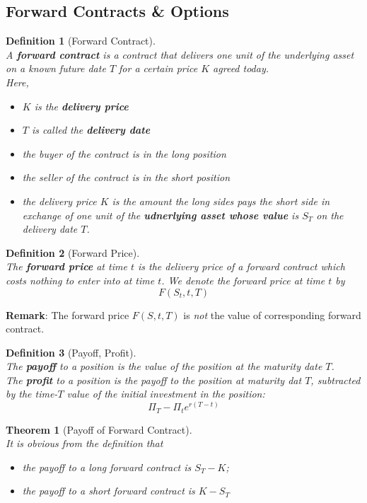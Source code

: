 \documentclass[12pt]{article}
\newtheorem{definition}{Definition}[section]
\newtheorem{theorem}{Theorem}[section]
\theoremstyle{definition}
\begin{document}
\subsection{Forward Contracts \& Options}
\begin{definition}[Forward Contract]
\hfill\\\normalfont A \textbf{forward contract} is a contract that delivers one unit of the underlying asset on a known future date $T$ for a certain price $K$ agreed today.\\
Here,
\begin{itemize}
  \item $K$ is the \textbf{delivery price}
  \item $T$ is called the \textbf{delivery date}
  \item the buyer of the contract is in the long position
  \item the seller of the contract is in the short position
  \item the delivery price $K$ is the amount the long sides pays the short side in exchange of one unit of the \textbf{udnerlying asset whose value} is $S_T$ on the delivery date $T$.
\end{itemize}
\end{definition}
\begin{definition}[Forward Price]
\hfill\\\normalfont The \textbf{forward price} at time $t$ is the delivery price of a forward contract which costs nothing to enter into at time $t$.
We denote the forward price at time $t$ by
\[
F(S_t, t, T)
\]
\end{definition}
\textbf{Remark}: The forward price $F(S,t,T)$ is \textit{not} the value of corresponding forward contract.
\begin{definition}[Payoff, Profit]
\hfill\\\normalfont The \textbf{payoff} to a position is the value of the position at the maturity date $T$.\\
The \textbf{profit} to a position is the payoff to the position at maturity dat $T$, subtracted by the time-$T$ value of the initial investment in the position:
\[
\Pi_T-\Pi_te^{r(T-t)}
\]
\end{definition}
\begin{theorem}[Payoff of Forward Contract]
\hfill\\\normalfont It is obvious from the definition that 
\begin{itemize}
  \item the payoff to a long forward contract is $S_T-K$;
  \item the payoff to a short forward contract is $K-S_T$
\end{itemize}
\end{theorem}
\end{document}
